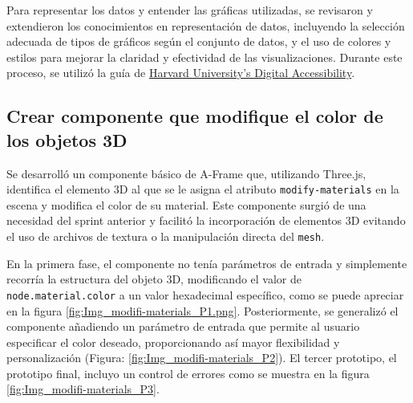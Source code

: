 \documentclass[a4paper, 12pt]{book}
\begin{document}
            Para representar los datos y entender las gráficas utilizadas, se revisaron y extendieron los conocimientos en representación de datos, incluyendo la selección adecuada de tipos de gráficos según el conjunto de datos, y el uso de colores y estilos para mejorar la claridad y efectividad de las visualizaciones. Durante este proceso, se utilizó la guía de \href{https://accessibility.huit.harvard.edu/data-viz-charts-graphs}{Harvard University's Digital Accessibility}.

            
            \subsection{Crear componente que modifique el color de los objetos 3D}    

            Se desarrolló un componente básico de A-Frame que, utilizando Three.js, identifica el elemento 3D al que se le asigna el atributo \texttt{modify-materials} en la escena y modifica el color de su material. Este componente surgió de una necesidad del sprint anterior y facilitó la incorporación de elementos 3D evitando el uso de archivos de textura o la manipulación directa del \texttt{mesh}.

            En la primera fase, el componente no tenía parámetros de entrada y simplemente recorría la estructura del objeto 3D, modificando el valor de \texttt{node.material.color} a un valor hexadecimal específico, como se puede apreciar en la figura \ref{fig:Img_modifi-materials_P1.png}. Posteriormente, se generalizó el componente añadiendo un parámetro de entrada que permite al usuario especificar el color deseado, proporcionando así mayor flexibilidad y personalización (Figura: \ref{fig:Img_modifi-materials_P2}). El tercer prototipo, el prototipo final, incluyo un control de errores como se muestra en la figura \ref{fig:Img_modifi-materials_P3}.
\end{document}
